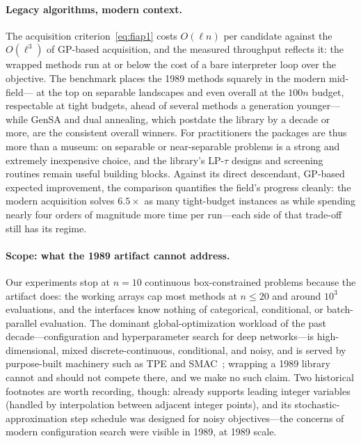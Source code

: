 \paragraph{Legacy algorithms, modern context.} The acquisition
criterion~\eqref{eq:fiap1} costs $O(\ell n)$ per candidate against the
$O(\ell^3)$ of GP-based acquisition, and the measured throughput
reflects it: the wrapped methods run at or below the cost of a bare
interpreter loop over the objective. The benchmark places the 1989
methods squarely in the modern mid-field--- at the top on
separable landscapes and even overall at the $100n$ budget,
 respectable at tight budgets,  ahead of
several methods a generation younger---while GenSA and dual annealing,
which postdate the library by a decade or more, are the consistent
overall winners. For practitioners the packages are thus more than a
museum: on separable or near-separable problems  is a
strong and extremely inexpensive choice, and the library's
LP-$\tau$ designs and screening routines remain useful building
blocks. Against its direct descendant, GP-based expected improvement,
the comparison quantifies the field's progress cleanly: the modern
acquisition solves $6.5\times$ as many tight-budget instances as
 while spending nearly four orders of magnitude more time
per run---each side of that trade-off still has its regime.

\paragraph{Scope: what the 1989 artifact cannot address.} Our
experiments stop at $n=10$ continuous box-constrained problems because
the artifact does: the working arrays cap most methods at $n\le 20$
and around $10^3$ evaluations, and the interfaces know nothing of
categorical, conditional, or batch-parallel evaluation. The dominant
global-optimization workload of the past decade---configuration and
hyperparameter search for deep networks---is high-dimensional, mixed
discrete-continuous, conditional, and noisy, and is served by purpose-built
machinery such as TPE and SMAC~\cite{bergstra2011algorithms,hutter2011smac};
wrapping a 1989 library cannot and should not compete there, and we
make no such claim. Two historical footnotes are worth recording,
though:  already supports leading integer variables
(handled by interpolation between adjacent integer points), and its
stochastic-approximation step schedule was designed for noisy
objectives---the concerns of modern configuration search were visible
in 1989, at 1989 scale.

